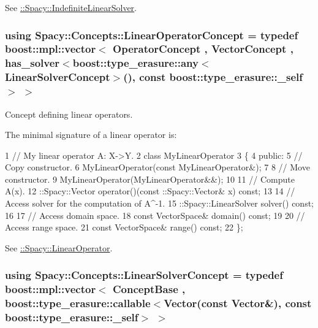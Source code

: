 See \hyperlink{namespaceSpacy_a168383be933a8316169c145f5e419604_IndefiniteLinearSolverAnchor}{\+:\+:Spacy\+:\+:Indefinite\+Linear\+Solver}. \hypertarget{group__ConceptGroup_gaf0e18e41c434cfceb77ccb8e785a8055_gaf0e18e41c434cfceb77ccb8e785a8055}{}
\subsubsection[{Linear\+Operator\+Concept}]{\setlength{\rightskip}{0pt plus 5cm}using {\bf Spacy\+::\+Concepts\+::\+Linear\+Operator\+Concept} = typedef boost\+::mpl\+::vector$<$ Operator\+Concept , Vector\+Concept , has\+\_\+solver$<$boost\+::type\+\_\+erasure\+::any$<$Linear\+Solver\+Concept$>$(), const boost\+::type\+\_\+erasure\+::\+\_\+self$>$ $>$}\label{group__ConceptGroup_gaf0e18e41c434cfceb77ccb8e785a8055_gaf0e18e41c434cfceb77ccb8e785a8055}


Concept defining linear operators. 

\label{group__ConceptGroup_gaf0e18e41c434cfceb77ccb8e785a8055_LinearOperatorConceptAnchor}%
\hypertarget{group__ConceptGroup_gaf0e18e41c434cfceb77ccb8e785a8055_LinearOperatorConceptAnchor}{}%
The minimal signature of a linear operator is\+: 
\begin{DoxyCode}
1 // My linear operator A: X->Y.
2 class MyLinearOperator
3 \{
4 public:
5   // Copy constructor.
6   MyLinearOperator(const MyLinearOperator&);
7 
8   // Move constructor.
9   MyLinearOperator(MyLinearOperator&&);
10 
11   // Compute A(x).
12   ::Spacy::Vector operator()(const ::Spacy::Vector& x) const;
13 
14   // Access solver for the computation of A^-1.
15   ::Spacy::LinearSolver solver() const;
16 
17   // Access domain space.
18   const VectorSpace& domain() const;
19 
20   // Access range space.
21   const VectorSpace& range() const;
22 \};
\end{DoxyCode}


See \hyperlink{group__SpacyGroup_ga584f7b9d82a844302ba0d77c3a1b6640_LinearOperatorAnchor}{\+:\+:Spacy\+:\+:Linear\+Operator}. \hypertarget{group__ConceptGroup_gac7d6a94c7131c8613e2ab26fddeb50bd_gac7d6a94c7131c8613e2ab26fddeb50bd}{}
\subsubsection[{Linear\+Solver\+Concept}]{\setlength{\rightskip}{0pt plus 5cm}using {\bf Spacy\+::\+Concepts\+::\+Linear\+Solver\+Concept} = typedef boost\+::mpl\+::vector$<$ Concept\+Base , boost\+::type\+\_\+erasure\+::callable$<$Vector(const Vector\&), const boost\+::type\+\_\+erasure\+::\+\_\+self$>$ $>$}\label{group__ConceptGroup_gac7d6a94c7131c8613e2ab26fddeb50bd_gac7d6a94c7131c8613e2ab26fddeb50bd}


